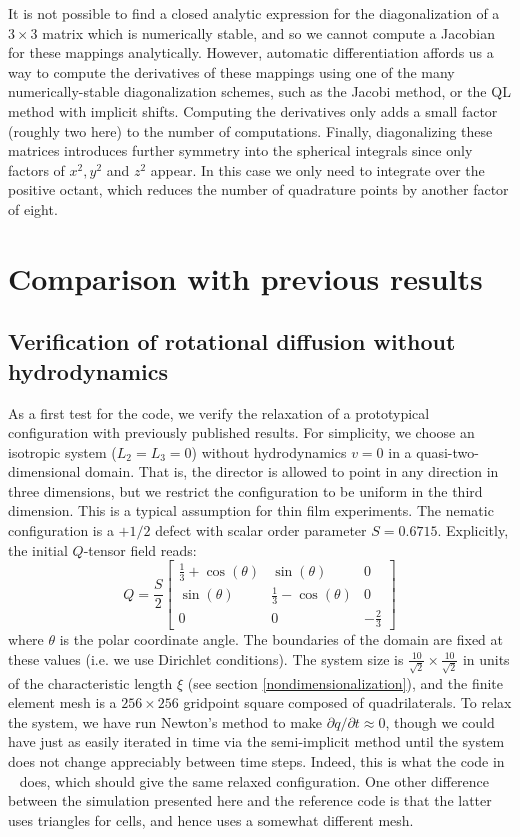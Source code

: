 \documentclass[reqno]{article}
\begin{document}
  It is not possible to find a closed analytic expression for the
  diagonalization of a $3\times 3$ matrix which is numerically stable, and so
  we cannot compute a Jacobian for these mappings analytically.
  However, automatic differentiation affords us a way to compute the derivatives
  of these mappings using one of the many numerically-stable diagonalization
  schemes, such as the Jacobi method, or the QL method with implicit shifts.
  Computing the derivatives only adds a small factor (roughly two here) to the
  number of computations.
  Finally, diagonalizing these matrices introduces further symmetry into the
  spherical integrals since only factors of $x^2, y^2$ and $z^2$ appear.
  In this case we only need to integrate over the positive octant, which reduces
  the number of quadrature points by another factor of eight.

  \section{Comparison with previous results}
  \subsection{Verification of rotational diffusion without hydrodynamics}
  As a first test for the code, we verify the relaxation of a prototypical
  configuration with previously published results.
  For simplicity, we choose an isotropic system ($L_2 = L_3 = 0$) without
  hydrodynamics $v = 0$ in a quasi-two-dimensional domain.
  That is, the director is allowed to point in any direction in three
  dimensions, but we restrict the configuration to be uniform in the third
  dimension.
  This is a typical assumption for thin film experiments.
  The nematic configuration is a $+1/2$ defect with scalar order parameter
  $S = 0.6715$.
  Explicitly, the initial $Q$-tensor field reads:
  \begin{equation}
    Q
    =
    \frac{S}{2}
    \begin{bmatrix}
      \tfrac13 + \cos(\theta) & \sin(\theta) & 0 \\
      \sin(\theta) & \tfrac13 - \cos(\theta) & 0 \\
      0 & 0 & -\tfrac23
    \end{bmatrix}
  \end{equation}
  where $\theta$ is the polar coordinate angle.
  The boundaries of the domain are fixed at these values (i.e. we use Dirichlet
  conditions).
  The system size is $\frac{10}{\sqrt{2}} \times \frac{10}{\sqrt{2}}$ in units
  of the characteristic length $\xi$ (see section \ref{nondimensionalization}), and the finite element mesh is a $256
  \times 256$ gridpoint square composed of quadrilaterals.
  To relax the system, we have run Newton's method to make $\partial q / \partial t \approx 0$,
  though we could have just as easily iterated in time via the semi-implicit
  method until the system does not change appreciably between time steps.
  Indeed, this is what the code in ~\cite{schimming_numerical_2021} does, which should give the
  same relaxed configuration.
  One other difference between the simulation presented here and the reference
  code is that the latter uses triangles for cells, and hence uses a somewhat
  different mesh.
  
\end{document}
